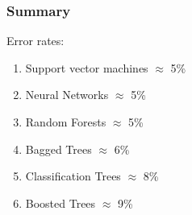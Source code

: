 \documentclass{beamer}
\begin{document}
\begin{frame}
	\frametitle{Summary}
	Error rates:
	\begin{enumerate}

		\item 	Support vector machines $\approx$ 5\%

		\item 	Neural Networks $\approx$ 5\%

		\item 	Random Forests $\approx$ 5\%

		\item 	Bagged Trees $\approx$ 6\%

		\item 	Classification Trees $\approx$ 8\%

		\item 	Boosted Trees $\approx$ 9\%

	\end{enumerate}


\end{frame}

\begin{frame}
\end{frame}
\end{document}

